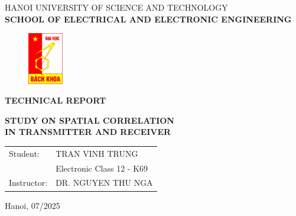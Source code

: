 \thispagestyle{empty}
\begin{center}
\vspace{-12pt}  HANOI UNIVERSITY OF SCIENCE AND TECHNOLOGY \\
\textbf{\fontsize{14pt}{0pt}\selectfont SCHOOL OF ELECTRICAL AND ELECTRONIC ENGINEERING}
\vspace{0.5cm}
 \begin{figure}[H]
     \centering
     \includegraphics[width=1.53cm,height=2.26cm]{Images/logodhbk.png}
 \end{figure}
\vspace{1.5cm}
\vspace{12pt}
\textbf{\fontsize{32pt}{0pt}\selectfont TECHNICAL REPORT}
\vspace{1.5cm}
\end{center}
\begin{center}
    \textbf{\fontsize{20pt}{0pt}\selectfont STUDY ON SPATIAL CORRELATION}\\
    \vspace{0.25cm}
    \textbf{\fontsize{20pt}{0pt}\selectfont IN TRANSMITTER AND RECEIVER}\\

\vspace{2cm}
\begin{table}[H]
    \centering
    \begin{tabular}{l l}
 \fontsize{14pt}{0pt}\selectfont Student:    & \fontsize{14pt}{0pt}\selectfont TRAN VINH TRUNG \vspace{6pt} \\ 
     & \fontsize{14pt}{0pt}\selectfont Electronic Class 12 - K69 \vspace{6pt}\\
\fontsize{14pt}{0pt}\selectfont Instructor: & \fontsize{14pt}{0pt}\selectfont DR. NGUYEN THU NGA \vspace{6pt}\\
\end{tabular}
\end{table}
\vspace{5cm}
 \fontsize{13pt}{0pt}\selectfont Hanoi, 07/2025
\end{center}
\cleardoublepage